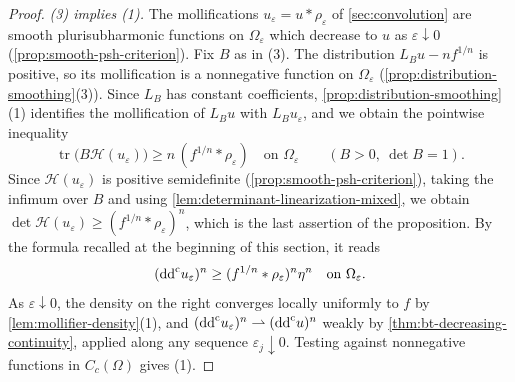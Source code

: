 \begin{proof}
\emph{(3) implies (1).} The mollifications $u_\varepsilon=u*\rho_\varepsilon$ of \cref{sec:convolution} are smooth plurisubharmonic functions on $\Omega_\varepsilon$ which decrease to $u$ as $\varepsilon\downarrow0$ (\cref{prop:smooth-psh-criterion}). Fix $B$ as in (3). The distribution $L_Bu-nf^{1/n}$ is positive, so its mollification is a nonnegative function on $\Omega_\varepsilon$ (\cref{prop:distribution-smoothing}(3)). Since $L_B$ has constant coefficients, \cref{prop:distribution-smoothing}(1) identifies the mollification of $L_Bu$ with $L_Bu_\varepsilon$, and we obtain the pointwise inequality
\[
 \operatorname{tr}\bigl(B\mathcal H(u_\varepsilon)\bigr)\ge n\,(f^{1/n}*\rho_\varepsilon)\quad\text{on }\Omega_\varepsilon\qquad(B>0,\ \det B=1).
\]
Since $\mathcal H(u_\varepsilon)$ is positive semidefinite (\cref{prop:smooth-psh-criterion}), taking the infimum over $B$ and using \cref{lem:determinant-linearization-mixed}, we obtain $\det\mathcal H(u_\varepsilon)\ge(f^{1/n}*\rho_\varepsilon)^n$, which is the last assertion of the proposition. By the formula recalled at the beginning of this section, it reads
\[
 (\mathrm{dd}^{\mathrm{c}} u_\varepsilon)^n\ge(f^{1/n}*\rho_\varepsilon)^n\eta^n\quad\text{on }\Omega_\varepsilon.
\]
As $\varepsilon\downarrow0$, the density on the right converges locally uniformly to $f$ by \cref{lem:mollifier-density}(1), and $(\mathrm{dd}^{\mathrm{c}} u_\varepsilon)^n\rightharpoonup(\mathrm{dd}^{\mathrm{c}} u)^n$ weakly by \cref{thm:bt-decreasing-continuity}, applied along any sequence $\varepsilon_j\downarrow0$. Testing against nonnegative functions in $C_c(\Omega)$ gives (1).
\end{proof}

